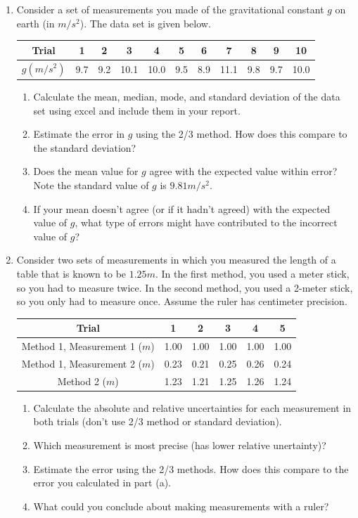 \begin{enumerate}
  \item Consider a set of measurements you made of the gravitational constant $g$ on earth (in $m/s^2$). The data set is given below.
  \begin{center}
    \begin{tabular}{| c | c | c | c | c | c | c | c | c | c | c |}
      \hline
      Trial &1&2&3&4&5&6&7&8&9&10 \\ \hline
      $g (m/s^2)$&9.7&9.2&10.1&10.0&9.5&8.9&11.1&9.8&9.7&10.0 \\
      \hline
    \end{tabular}
  \end{center}
  \begin{enumerate}
    \item Calculate the mean, median, mode, and standard deviation of the data set using excel and include them in your report.
    \item Estimate the error in $g$ using the 2/3 method. How does this compare to the standard deviation?
    \item Does the mean value for $g$ agree with the expected value within error? Note the standard value of $g$  is $9.81 m/s^2$.
    \item If your mean doesn't agree (or if it hadn't agreed) with the expected value of $g$, what type of errors might have contributed to the incorrect value of $g$?
  \end{enumerate}

  \item Consider two sets of measurements in which you measured the length of a table that is known to be $1.25 m$. In the first method, you used a meter stick, so you had to measure twice. In the second method, you used a 2-meter stick, so you only had to measure once. Assume the ruler has centimeter precision.
  \begin{center}
    \begin{tabular}{ |c | c | c | c | c | c |}
      \hline
      Trial &1&2&3&4&5 \\ \hline
      Method 1, Measurement 1 ($m$) & 1.00 & 1.00 & 1.00 &1.00 &1.00 \\
      \hline
      Method 1, Measurement 2  ($m$)& 0.23 &0.21&0.25&0.26&0.24 \\
      \hline
      Method 2 ($m$)& 1.23&1.21&1.25&1.26&1.24 \\
      \hline
    \end{tabular}
  \end{center}
  \begin{enumerate}
    \item Calculate the absolute and relative uncertainties for each measurement in both trials (don't use 2/3 method or standard deviation).
    \item Which measurement is most precise (has lower relative unertainty)?
    \item Estimate the error using the 2/3 methods. How does this compare to the error you calculated in part (a).
    \item What could you conclude about making measurements with a ruler?
  \end{enumerate}


\end{enumerate}
